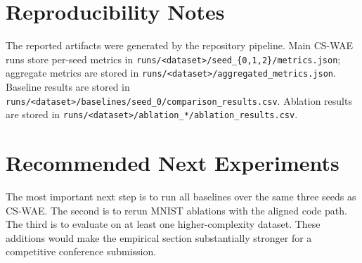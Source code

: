 \documentclass[10pt]{article}
\begin{document}
\section{Reproducibility Notes}

The reported artifacts were generated by the repository pipeline. Main CS-WAE runs store per-seed metrics in \texttt{runs/<dataset>/seed\_\{0,1,2\}/metrics.json}; aggregate metrics are stored in \texttt{runs/<dataset>/aggregated\_metrics.json}. Baseline results are stored in \texttt{runs/<dataset>/baselines/seed\_0/comparison\_results.csv}. Ablation results are stored in \texttt{runs/<dataset>/ablation\_*/ablation\_results.csv}.

\section{Recommended Next Experiments}

The most important next step is to run all baselines over the same three seeds as CS-WAE. The second is to rerun MNIST ablations with the aligned code path. The third is to evaluate on at least one higher-complexity dataset. These additions would make the empirical section substantially stronger for a competitive conference submission.
\end{document}

